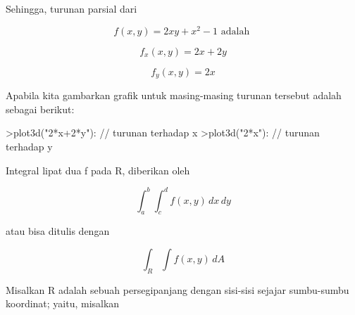 \documentclass[a4paper,10pt]{article}
\begin{document}
\begin{eulernotebook}
\begin{eulercomment}
\begin{eulercomment}
\begin{eulercomment}
\begin{eulercomment}
\begin{eulercomment}
\begin{eulercomment}
\begin{eulercomment}
\begin{eulercomment}
\begin{eulercomment}
\begin{eulercomment}
\begin{eulercomment}
\begin{eulercomment}
\begin{eulercomment}
\begin{eulercomment}
\begin{eulercomment}
\begin{eulercomment}
\begin{eulercomment}
\begin{eulercomment}
\begin{eulercomment}
\begin{eulercomment}
\begin{eulercomment}
\begin{eulercomment}
\begin{eulercomment}
\begin{eulercomment}
\begin{eulercomment}
\begin{eulercomment}
\begin{eulercomment}
\begin{eulercomment}
\begin{eulercomment}
\begin{eulercomment}
\begin{eulercomment}
Sehingga, turunan parsial dari\\
\end{eulercomment}
\begin{eulerformula}
\[
f(x,y)=2xy+x^2-1 \text{ adalah }
\]
\end{eulerformula}
\begin{eulerformula}
\[
f_x(x,y)=2x+2y
\]
\end{eulerformula}
\begin{eulerformula}
\[
f_y(x,y)=2x
\]
\end{eulerformula}
\begin{eulercomment}
Apabila kita gambarkan grafik untuk masing-masing turunan tersebut
adalah sebagai berikut:
\end{eulercomment}
\begin{eulerprompt}
>plot3d("2*x+2*y"): // turunan terhadap x
>plot3d("2*x"): // turunan terhadap y
\end{eulerprompt}
\begin{eulercomment}
\end{eulercomment}
\begin{eulercomment}
Integral lipat dua f pada R, diberikan oleh\\
\end{eulercomment}
\begin{eulerformula}
\[
\int_{a}^{b} \int_{c}^{d} f(x, y) \, dx \, dy
\]
\end{eulerformula}
\begin{eulercomment}
atau bisa ditulis dengan\\
\end{eulercomment}
\begin{eulerformula}
\[
\int _R \int f(x,y) \, dA
\]
\end{eulerformula}
\begin{eulercomment}
Misalkan R adalah sebuah persegipanjang dengan sisi-sisi sejajar
sumbu-sumbu koordinat; yaitu, misalkan\\

\end{eulercomment}
\end{eulercomment}
\end{eulercomment}
\end{eulercomment}
\end{eulercomment}
\end{eulercomment}
\end{eulercomment}
\end{eulercomment}
\end{eulercomment}
\end{eulercomment}
\end{eulercomment}
\end{eulercomment}
\end{eulercomment}
\end{eulercomment}
\end{eulercomment}
\end{eulercomment}
\end{eulercomment}
\end{eulercomment}
\end{eulercomment}
\end{eulercomment}
\end{eulercomment}
\end{eulercomment}
\end{eulercomment}
\end{eulercomment}
\end{eulercomment}
\end{eulercomment}
\end{eulercomment}
\end{eulercomment}
\end{eulercomment}
\end{eulercomment}
\end{eulercomment}
\end{eulernotebook}
\end{document}
